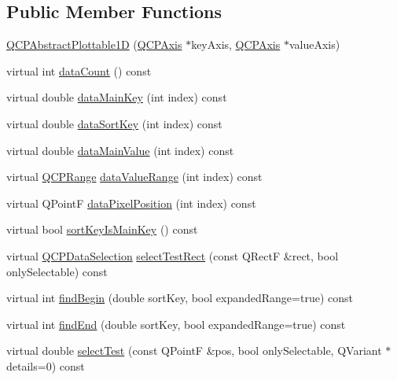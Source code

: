 \subsection*{Public Member Functions}
\begin{DoxyCompactItemize}
\item 
\hyperlink{class_q_c_p_abstract_plottable1_d_a30b2e50ab0afce65f104ea7a95440315}{Q\+C\+P\+Abstract\+Plottable1D} (\hyperlink{class_q_c_p_axis}{Q\+C\+P\+Axis} $\ast$key\+Axis, \hyperlink{class_q_c_p_axis}{Q\+C\+P\+Axis} $\ast$value\+Axis)
\item 
virtual int \hyperlink{class_q_c_p_abstract_plottable1_d_a8a65a68ba720ad2b6f9686843e3a89f3}{data\+Count} () const 
\item 
virtual double \hyperlink{class_q_c_p_abstract_plottable1_d_adc6821839b138f8e8696bdb18dd6ad45}{data\+Main\+Key} (int index) const 
\item 
virtual double \hyperlink{class_q_c_p_abstract_plottable1_d_acee921e5fcbdd82d1864d361a12f8971}{data\+Sort\+Key} (int index) const 
\item 
virtual double \hyperlink{class_q_c_p_abstract_plottable1_d_affeffff62c1d4e12ca669d1e595bda16}{data\+Main\+Value} (int index) const 
\item 
virtual \hyperlink{class_q_c_p_range}{Q\+C\+P\+Range} \hyperlink{class_q_c_p_abstract_plottable1_d_a311077f0302287cfc73bc2097665b997}{data\+Value\+Range} (int index) const 
\item 
virtual Q\+PointF \hyperlink{class_q_c_p_abstract_plottable1_d_a1ad8a1bfddb2d84f3c8393da44e531ed}{data\+Pixel\+Position} (int index) const 
\item 
virtual bool \hyperlink{class_q_c_p_abstract_plottable1_d_af04a13ce0c005e77bd3faad4ed40744e}{sort\+Key\+Is\+Main\+Key} () const 
\item 
virtual \hyperlink{class_q_c_p_data_selection}{Q\+C\+P\+Data\+Selection} \hyperlink{class_q_c_p_abstract_plottable1_d_ad7116feb1ac4eb4e8a3c4819d853ea6f}{select\+Test\+Rect} (const Q\+RectF \&rect, bool only\+Selectable) const 
\item 
virtual int \hyperlink{class_q_c_p_abstract_plottable1_d_ad26ffee0a968415483cee43b983ea229}{find\+Begin} (double sort\+Key, bool expanded\+Range=true) const 
\item 
virtual int \hyperlink{class_q_c_p_abstract_plottable1_d_acdef33e3455383e9f25939cdaf981dc5}{find\+End} (double sort\+Key, bool expanded\+Range=true) const 
\item 
virtual double \hyperlink{class_q_c_p_abstract_plottable1_d_a6c74e8da051e0e6b763a4be2cb139e8e}{select\+Test} (const Q\+PointF \&pos, bool only\+Selectable, Q\+Variant $\ast$details=0) const 

\end{DoxyCompactItemize}
